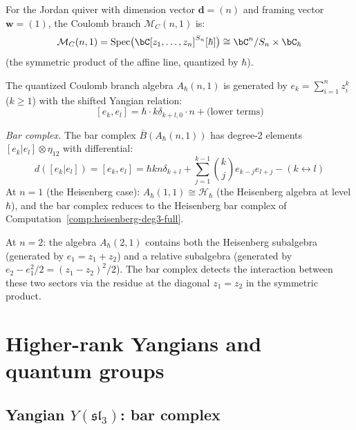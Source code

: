 \begin{computation}
\label{comp:coulomb-bar}

For the Jordan quiver with dimension vector $\mathbf{d} = (n)$
and framing vector $\mathbf{w} = (1)$, the Coulomb branch
$\mathcal{M}_C(n, 1)$ is:
\[
\mathcal{M}_C(n, 1)
= \operatorname{Spec}\bigl(
\bC[z_1, \ldots, z_n]^{S_n}[\hbar]\bigr)
\cong \bC^n/S_n \times \bC_\hbar
\]
(the symmetric product of the affine line, quantized by $\hbar$).

The quantized Coulomb branch algebra
$A_\hbar(n, 1)$ is generated by
$e_k = \sum_{i=1}^n z_i^k$ ($k \geq 1$) with
the shifted Yangian relation:
\[
[e_k, e_l] = \hbar \cdot k \delta_{k+l, 0} \cdot n
+ \text{(lower terms)}
\]

\emph{Bar complex.}
The bar complex $\bar{B}(A_\hbar(n,1))$ has degree-2
elements $[e_k | e_l] \otimes \eta_{12}$ with differential:
\[
d([e_k | e_l]) = [e_k, e_l]
= \hbar k n \delta_{k+l} + \sum_{j=1}^{k-1}
\binom{k}{j} e_{k-j} e_{l+j} - (k \leftrightarrow l)
\]
At $n = 1$ (the Heisenberg case): $A_\hbar(1,1) \cong
\mathcal{H}_\hbar$ (the Heisenberg algebra at level $\hbar$),
and the bar complex reduces to the Heisenberg bar complex
of Computation~\ref{comp:heisenberg-deg3-full}.

At $n = 2$: the algebra $A_\hbar(2,1)$ contains both the
Heisenberg subalgebra (generated by $e_1 = z_1 + z_2$) and
a relative subalgebra (generated by $e_2 - e_1^2/2
= (z_1-z_2)^2/2$). The bar complex detects the interaction
between these two sectors via the residue at the diagonal
$z_1 = z_2$ in the symmetric product.
\end{computation}


\section{Higher-rank Yangians and quantum groups}
\label{sec:higher-rank-yangians}

\subsection{\texorpdfstring{Yangian $Y(\mathfrak{sl}_3)$: bar complex}{Yangian Y(sl3): bar complex}}

